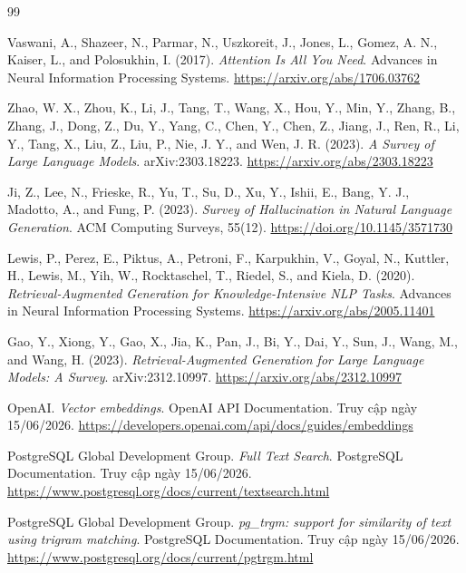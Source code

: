 \documentclass[12pt,a4paper]{report}
\begin{document}
\begin{thebibliography}{99}

Vaswani, A., Shazeer, N., Parmar, N., Uszkoreit, J., Jones, L., Gomez, A. N., Kaiser, L., and Polosukhin, I. (2017). \textit{Attention Is All You Need}. Advances in Neural Information Processing Systems. \url{https://arxiv.org/abs/1706.03762}

Zhao, W. X., Zhou, K., Li, J., Tang, T., Wang, X., Hou, Y., Min, Y., Zhang, B., Zhang, J., Dong, Z., Du, Y., Yang, C., Chen, Y., Chen, Z., Jiang, J., Ren, R., Li, Y., Tang, X., Liu, Z., Liu, P., Nie, J. Y., and Wen, J. R. (2023). \textit{A Survey of Large Language Models}. arXiv:2303.18223. \url{https://arxiv.org/abs/2303.18223}

Ji, Z., Lee, N., Frieske, R., Yu, T., Su, D., Xu, Y., Ishii, E., Bang, Y. J., Madotto, A., and Fung, P. (2023). \textit{Survey of Hallucination in Natural Language Generation}. ACM Computing Surveys, 55(12). \url{https://doi.org/10.1145/3571730}

Lewis, P., Perez, E., Piktus, A., Petroni, F., Karpukhin, V., Goyal, N., Kuttler, H., Lewis, M., Yih, W., Rocktaschel, T., Riedel, S., and Kiela, D. (2020). \textit{Retrieval-Augmented Generation for Knowledge-Intensive NLP Tasks}. Advances in Neural Information Processing Systems. \url{https://arxiv.org/abs/2005.11401}

Gao, Y., Xiong, Y., Gao, X., Jia, K., Pan, J., Bi, Y., Dai, Y., Sun, J., Wang, M., and Wang, H. (2023). \textit{Retrieval-Augmented Generation for Large Language Models: A Survey}. arXiv:2312.10997. \url{https://arxiv.org/abs/2312.10997}

OpenAI. \textit{Vector embeddings}. OpenAI API Documentation. Truy cập ngày 15/06/2026. \url{https://developers.openai.com/api/docs/guides/embeddings}

PostgreSQL Global Development Group. \textit{Full Text Search}. PostgreSQL Documentation. Truy cập ngày 15/06/2026. \url{https://www.postgresql.org/docs/current/textsearch.html}

PostgreSQL Global Development Group. \textit{pg\_trgm: support for similarity of text using trigram matching}. PostgreSQL Documentation. Truy cập ngày 15/06/2026. \url{https://www.postgresql.org/docs/current/pgtrgm.html}


\end{thebibliography}
\end{document}
